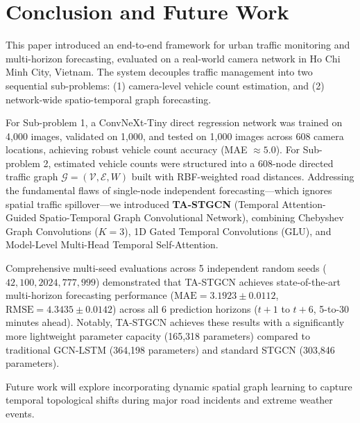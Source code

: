 \section{Conclusion and Future Work}

This paper introduced an end-to-end framework for urban traffic monitoring and multi-horizon forecasting, evaluated on a real-world camera network in Ho Chi Minh City, Vietnam. The system decouples traffic management into two sequential sub-problems: (1) camera-level vehicle count estimation, and (2) network-wide spatio-temporal graph forecasting.

For Sub-problem 1, a ConvNeXt-Tiny direct regression network was trained on 4,000 images, validated on 1,000, and tested on 1,000 images across 608 camera locations, achieving robust vehicle count accuracy (MAE $\approx 5.0$). For Sub-problem 2, estimated vehicle counts were structured into a 608-node directed traffic graph $\mathcal{G} = (\mathcal{V}, \mathcal{E}, W)$ built with RBF-weighted road distances. Addressing the fundamental flaws of single-node independent forecasting—which ignores spatial traffic spillover—we introduced \textbf{TA-STGCN} (Temporal Attention-Guided Spatio-Temporal Graph Convolutional Network), combining Chebyshev Graph Convolutions ($K=3$), 1D Gated Temporal Convolutions (GLU), and Model-Level Multi-Head Temporal Self-Attention.

Comprehensive multi-seed evaluations across 5 independent random seeds ($42, 100, 2024, 777, 999$) demonstrated that TA-STGCN achieves state-of-the-art multi-horizon forecasting performance ($\text{MAE} = 3.1923 \pm 0.0112$, $\text{RMSE} = 4.3435 \pm 0.0142$) across all 6 prediction horizons ($t+1$ to $t+6$, 5-to-30 minutes ahead). Notably, TA-STGCN achieves these results with a significantly more lightweight parameter capacity (165,318 parameters) compared to traditional GCN-LSTM (364,198 parameters) and standard STGCN (303,846 parameters).

Future work will explore incorporating dynamic spatial graph learning to capture temporal topological shifts during major road incidents and extreme weather events.
